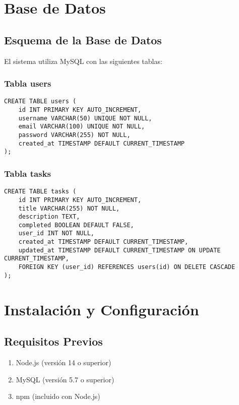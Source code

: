 \documentclass[12pt,a4paper]{article}
\begin{document}
\section{Base de Datos}

\subsection{Esquema de la Base de Datos}

El sistema utiliza MySQL con las siguientes tablas:

\subsubsection{Tabla users}
\begin{lstlisting}
CREATE TABLE users (
    id INT PRIMARY KEY AUTO_INCREMENT,
    username VARCHAR(50) UNIQUE NOT NULL,
    email VARCHAR(100) UNIQUE NOT NULL,
    password VARCHAR(255) NOT NULL,
    created_at TIMESTAMP DEFAULT CURRENT_TIMESTAMP
);
\end{lstlisting}

\subsubsection{Tabla tasks}
\begin{lstlisting}
CREATE TABLE tasks (
    id INT PRIMARY KEY AUTO_INCREMENT,
    title VARCHAR(255) NOT NULL,
    description TEXT,
    completed BOOLEAN DEFAULT FALSE,
    user_id INT NOT NULL,
    created_at TIMESTAMP DEFAULT CURRENT_TIMESTAMP,
    updated_at TIMESTAMP DEFAULT CURRENT_TIMESTAMP ON UPDATE CURRENT_TIMESTAMP,
    FOREIGN KEY (user_id) REFERENCES users(id) ON DELETE CASCADE
);
\end{lstlisting}

\section{Instalación y Configuración}

\subsection{Requisitos Previos}

\begin{enumerate}
    \item Node.js (versión 14 o superior)
    \item MySQL (versión 5.7 o superior)
    \item npm (incluido con Node.js)
\end{enumerate}
\end{document}

